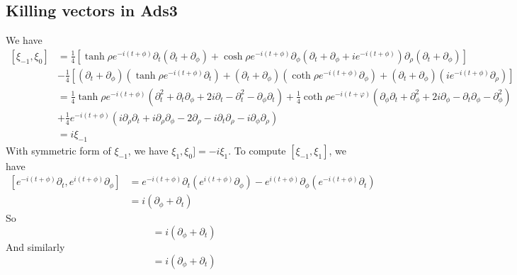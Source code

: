 \subsection{Killing vectors in Ads3}
We have 
\begin{equation}
	\begin{split}
	[\xi_{-1},\xi_0] &= \frac{1}{4} \left[\tanh\rho e^{-i(t+\phi)} \partial_t ( \partial_t + \partial_{\phi}) + \cosh \rho e^{-i(t+\phi)} \partial_{\phi}(\partial_t + \partial_{\phi} + i e^{-i(t+\phi)} ) \partial_\rho (\partial_t + \partial_{\phi})  \right]\\
	& - \frac{1}{4} \left[(\partial_t + \partial_{\phi}) (\tanh\rho e^{-i(t+\phi)} \partial_t) + (\partial_t + \partial_{\phi})( \coth \rho e^{-i(t+\phi)} \partial_{\phi}) + (\partial_t + \partial_{\phi})(ie^{-i(t+\phi)} \partial_{\rho}) \right]\\
	&= \frac{1}{4} \tanh\rho e^{-i (t+\phi)} \left( \partial^2_t +  \partial_t \partial_{\phi} + 2 i\partial_t - \partial_t^2 - \partial_{\phi} \partial_t\right) + \frac{1}{4} \coth \rho e^{-i(t+\varphi)} \left( \partial_{\phi} \partial_t + \partial^2_{\phi} + 2i \partial_{\phi} - \partial_t \partial_{\phi} - \partial^2_{\phi} \right)\\
	&+ \frac{1}{4}e^{-i(t+\phi)} \left(i \partial_\rho \partial_t + i \partial_\rho \partial_{\phi} - 2 \partial_{\rho} - i \partial_t \partial_{\rho} - i \partial_{\phi}\partial_{\rho} \right)\\
	& =i \xi_{-1}
	\end{split}
\end{equation}
With symmetric form of $\xi_{-1}$, we have $\xi_1, \xi_0] = - i\xi_1$.
To compute $[\xi_{-1},\xi_1]$, we have
\begin{equation}
	\begin{split}
	[e^{-i(t+\phi)}\partial_t, e^{i(t+\phi)}\partial_{\phi}]& = e^{-i(t+\phi)} \partial_t \left( e^{i(t+\phi)} \partial_{\phi} \right) - e^{i(t+\phi)} \partial_{\phi} \left(e^{-i(t+\phi)} \partial_t \right)\\
	& = i (\partial_\phi + \partial_t)
	\end{split}
\end{equation}
So 
\begin{equation}
	[\tanh \rho e^{-i(t+\phi)} \partial_t , \tanh\rho e^{i(t+\phi)} \partial_t] = i ( \partial_{\phi} + \partial_t)
\end{equation}
And similarly
\begin{equation}
	[\coth \rho e^{-i(t+\phi)} \partial_{\phi}, \tanh\rho e^{i(t+\phi)} \partial_t]= i( \partial_\phi + \partial_t)
\end{equation}
